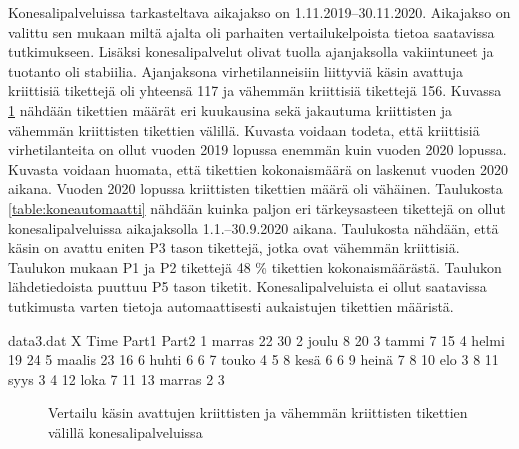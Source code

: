 Konesalipalveluissa tarkasteltava aikajakso on 1.11.2019--30.11.2020. Aikajakso on valittu sen mukaan miltä ajalta oli parhaiten vertailukelpoista tietoa saatavissa tutkimukseen. Lisäksi konesalipalvelut olivat tuolla ajanjaksolla vakiintuneet ja tuotanto oli stabiilia. Ajanjaksona virhetilanneisiin liittyviä käsin avattuja kriittisiä tikettejä oli yhteensä 117 ja vähemmän kriittisiä tikettejä 156. Kuvassa \ref{fig:konesalitiketit} nähdään tikettien määrät eri kuukausina sekä jakautuma kriittisten ja vähemmän kriittisten tikettien välillä. Kuvasta voidaan todeta, että kriittisiä virhetilanteita on ollut vuoden 2019 lopussa enemmän kuin vuoden 2020 lopussa. Kuvasta voidaan huomata, että tikettien kokonaismäärä on laskenut vuoden 2020 aikana. Vuoden 2020 lopussa kriittisten tikettien määrä oli vähäinen. Taulukosta \ref{table:koneautomaatti} nähdään kuinka paljon eri tärkeysasteen tikettejä on ollut konesalipalveluissa aikajaksolla 1.1.--30.9.2020 aikana. Taulukosta nähdään, että käsin on avattu eniten P3 tason tikettejä, jotka ovat vähemmän kriittisiä. Taulukon mukaan P1 ja P2 tikettejä 48 \% tikettien kokonaismäärästä. Taulukon lähdetiedoista puuttuu P5 tason tiketit. Konesalipalveluista ei ollut saatavissa tutkimusta varten tietoja automaattisesti aukaistujen tikettien määristä.

\begin{filecontents}{data3.dat}
X Time  	Part1  Part2
1 marras  	22	    30
2 joulu		8	    20
3 tammi 	7	    15
4 helmi		19	    24
5 maalis	23	    16
6 huhti		6	    6
7 touko		4	    5
8 kesä      6       6
9 heinä     7       8
10 elo      3       8
11 syys     3       4
12 loka     7       11
13 marras   2       3
\end{filecontents}

\begin{figure}[ht]
\caption{Vertailu käsin avattujen kriittisten ja vähemmän kriittisten tikettien välillä konesalipalveluissa}
\label{fig:konesalitiketit}
\end{figure}

